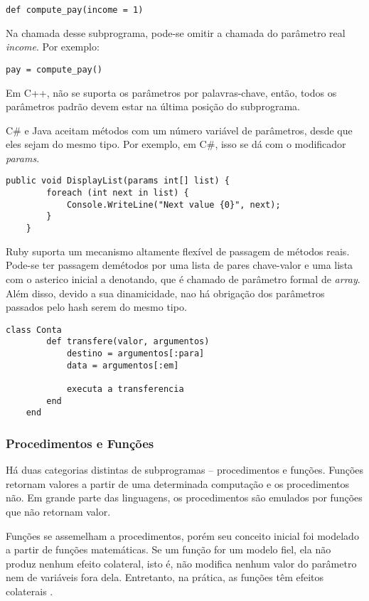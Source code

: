 \begin{verbatim}
def compute_pay(income = 1)
\end{verbatim}

Na chamada desse subprograma, pode-se omitir a chamada do parâmetro real \emph{income}.
Por exemplo:

\begin{verbatim}
pay = compute_pay()
\end{verbatim}

Em C++, não se suporta os parâmetros por palavras-chave, então, 
todos os parâmetros padrão devem estar na última posição do subprograma.

C\# e Java aceitam métodos com um número variável de parâmetros,
desde que eles sejam do mesmo tipo.
Por exemplo, em C\#, isso se dá com o modificador \emph{params}.

\begin{lstlisting}[caption=Código retirado de \cite{sebesta}]
	public void DisplayList(params int[] list) {
		foreach (int next in list) {
			Console.WriteLine("Next value {0}", next);
		}
	}

\end{lstlisting}
\label{scope_binding}

Ruby suporta um mecanismo altamente flexível de passagem de métodos reais.
Pode-se ter passagem demétodos por uma lista de pares chave-valor 
e uma lista com o asterico inicial a denotando, que é chamado de 
parâmetro formal de \emph{array}. Além disso,
devido a sua dinamicidade,
nao há obrigação dos parâmetros passados pelo hash serem do mesmo tipo.


\begin{lstlisting}[caption=Código retirado de \cite{caelum}]
	class Conta
  		def transfere(valor, argumentos)
    		destino = argumentos[:para]
    		data = argumentos[:em]

    		executa a transferencia
  		end
	end
\end{lstlisting}
\label{scope_binding}

\subsubsection{Procedimentos e Funções} %
\label{ssub:procedimentos_e_fun_es}

Há duas categorias distintas de subprogramas – procedimentos e funções.
Funções retornam valores a partir de uma determinada computação e 
os procedimentos não. 
Em grande parte das linguagens, os procedimentos são emulados por funções que não retornam valor.

Funções se assemelham a procedimentos, porém seu conceito inicial foi modelado a partir de funções matemáticas.
Se um função for um modelo fiel, ela não produz nenhum efeito colateral,
isto é, não modifica nenhum valor do parâmetro nem de variáveis fora dela.
Entretanto, na prática, as funções têm efeitos colaterais \cite{sebesta}.



